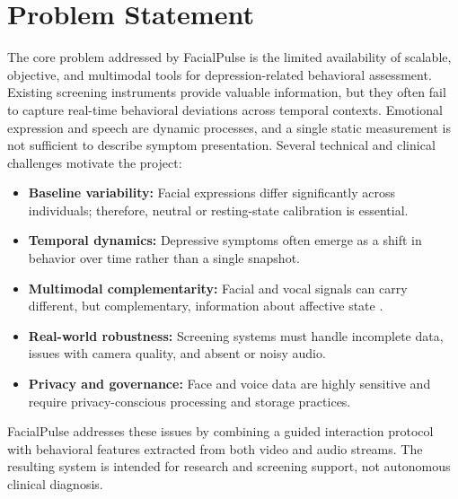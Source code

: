 \documentclass[conference, 12pt]{IEEEtran}
\begin{document}
\section{Problem Statement}
The core problem addressed by FacialPulse is the limited availability of scalable, objective, and multimodal tools for depression-related behavioral assessment. Existing screening instruments provide valuable information, but they often fail to capture real-time behavioral deviations across temporal contexts. Emotional expression and speech are dynamic processes, and a single static measurement is not sufficient to describe symptom presentation. Several technical and clinical challenges motivate the project:
\begin{itemize}[leftmargin=1.5em]
    \item \textbf{Baseline variability:} Facial expressions differ significantly across individuals; therefore, neutral or resting-state calibration is essential.
    \item \textbf{Temporal dynamics:} Depressive symptoms often emerge as a shift in behavior over time rather than a single snapshot.
    \item \textbf{Multimodal complementarity:} Facial and vocal signals can carry different, but complementary, information about affective state \cite{ref5}.
    \item \textbf{Real-world robustness:} Screening systems must handle incomplete data, issues with camera quality, and absent or noisy audio.
    \item \textbf{Privacy and governance:} Face and voice data are highly sensitive and require privacy-conscious processing and storage practices.
\end{itemize}
FacialPulse addresses these issues by combining a guided interaction protocol with behavioral features extracted from both video and audio streams. The resulting system is intended for research and screening support, not autonomous clinical diagnosis.
\end{document}

